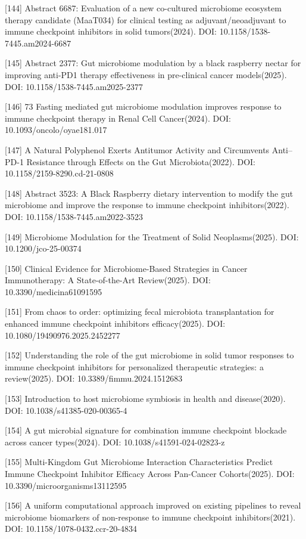 \documentclass[11pt]{article}
\begin{document}
{[}144{]} Abstract 6687: Evaluation of a new co-cultured microbiome ecosystem therapy candidate (MaaT034) for clinical testing as adjuvant/neoadjuvant to immune checkpoint inhibitors in solid tumors(2024). DOI: 10.1158/1538-7445.am2024-6687

{[}145{]} Abstract 2377: Gut microbiome modulation by a black raspberry nectar for improving anti-PD1 therapy effectiveness in pre-clinical cancer models(2025). DOI: 10.1158/1538-7445.am2025-2377

{[}146{]} 73 Fasting mediated gut microbiome modulation improves response to immune checkpoint therapy in Renal Cell Cancer(2024). DOI: 10.1093/oncolo/oyae181.017

{[}147{]} A Natural Polyphenol Exerts Antitumor Activity and Circumvents Anti--PD-1 Resistance through Effects on the Gut Microbiota(2022). DOI: 10.1158/2159-8290.cd-21-0808

{[}148{]} Abstract 3523: A Black Raspberry dietary intervention to modify the gut microbiome and improve the response to immune checkpoint inhibitors(2022). DOI: 10.1158/1538-7445.am2022-3523

{[}149{]} Microbiome Modulation for the Treatment of Solid Neoplasms(2025). DOI: 10.1200/jco-25-00374

{[}150{]} Clinical Evidence for Microbiome-Based Strategies in Cancer Immunotherapy: A State-of-the-Art Review(2025). DOI: 10.3390/medicina61091595

{[}151{]} From chaos to order: optimizing fecal microbiota transplantation for enhanced immune checkpoint inhibitors efficacy(2025). DOI: 10.1080/19490976.2025.2452277

{[}152{]} Understanding the role of the gut microbiome in solid tumor responses to immune checkpoint inhibitors for personalized therapeutic strategies: a review(2025). DOI: 10.3389/fimmu.2024.1512683

{[}153{]} Introduction to host microbiome symbiosis in health and disease(2020). DOI: 10.1038/s41385-020-00365-4

{[}154{]} A gut microbial signature for combination immune checkpoint blockade across cancer types(2024). DOI: 10.1038/s41591-024-02823-z

{[}155{]} Multi-Kingdom Gut Microbiome Interaction Characteristics Predict Immune Checkpoint Inhibitor Efficacy Across Pan-Cancer Cohorts(2025). DOI: 10.3390/microorganisms13112595

{[}156{]} A uniform computational approach improved on existing pipelines to reveal microbiome biomarkers of non-response to immune checkpoint inhibitors(2021). DOI: 10.1158/1078-0432.ccr-20-4834
\end{document}
